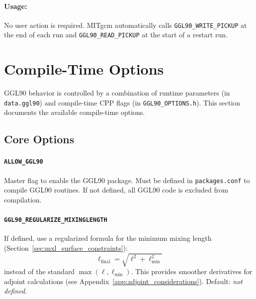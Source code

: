 \documentclass[12pt,letterpaper]{article}
\begin{document}
\paragraph{Usage:} No user action is required. MITgcm automatically calls \verb|GGL90_WRITE_PICKUP| at the end of each run and \verb|GGL90_READ_PICKUP| at the start of a restart run.

\section{Compile-Time Options}
\label{sec:cpp_options}

GGL90 behavior is controlled by a combination of runtime parameters (in \verb|data.ggl90|) and compile-time CPP flags (in \verb|GGL90_OPTIONS.h|). This section documents the available compile-time options.

\subsection{Core Options}
\label{sec:core_cpp}

\paragraph{\texttt{ALLOW\_GGL90}}

Master flag to enable the GGL90 package. Must be defined in \verb|packages.conf| to compile GGL90 routines. If not defined, all GGL90 code is excluded from compilation.

\paragraph{\texttt{GGL90\_REGULARIZE\_MIXINGLENGTH}}

If defined, use a regularized formula for the minimum mixing length (Section~\ref{sec:mxl_surface_constraints}):
\begin{equation*}
\ell_{\text{final}} = \sqrt{\ell^2 + \ell_{\text{min}}^2}
\end{equation*}
instead of the standard $\max(\ell, \ell_{\text{min}})$. This provides smoother derivatives for adjoint calculations (see Appendix~\ref{app:adjoint_considerations}). Default: \emph{not defined}.
\end{document}
